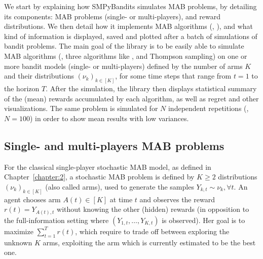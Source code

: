 We start by explaining how SMPyBandits simulates MAB problems, by detailing its components:
MAB problems (single- or multi-players),
and reward distributions.
%
We then detail how it implements MAB algorithms (\eg, \UCB),
and what kind of information is displayed, saved and plotted after a batch of simulations of bandit problems.
%
%
The main goal of the library is to be easily able to simulate MAB algorithms (\eg, three algorithms like \UCB, \klUCB{} and Thompson sampling) on one or more bandit models (single- or multi-players) defined by the number of arms $K$ and their distributions $(\nu_k)_{k\in[K]}$, for some time steps that range from $t=1$ to the horizon $T$.
After the simulation, the library then displays statistical summary of the (mean) rewards accumulated by each algorithm, as well as regret and other visualizations.
The same problem is simulated for $N$ independent repetitions (\eg, $N=100$) in order to show mean results with low variances.


\subsection{Single- and multi-players MAB problems}

For the classical single-player stochastic MAB model, as defined in Chapter~\ref{chapter:2},
a stochastic MAB problem is defined by $K \geq 2$ distributions $(\nu_k)_{k\in[K]}$ (also called arms),
used to generate the \iid{} samples $Y_{k,t} \sim \nu_k, \forall t$.
%
An agent chooses arm $A(t)\in[K]$ at time $t$ and observes the reward $r(t) = Y_{A(t),t}$ without knowing the other (hidden) rewards (in opposition to the full-information setting where $(Y_{1,t},\dots,Y_{K,t})$ is observed).
%
Her goal is to maximize $\sum_{t=1}^T r(t)$, which require to trade off between exploring the unknown $K$ arms, exploiting the arm which is currently estimated to be the best one.

